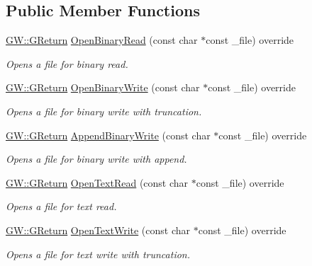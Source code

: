 \subsection*{Public Member Functions}
\begin{DoxyCompactItemize}
\item 
\hyperlink{namespaceGW_a67a839e3df7ea8a5c5686613a7a3de21}{G\+W\+::\+G\+Return} \hyperlink{classFileIO_a0adeb88dd23bb5897e8315ab0029c835}{Open\+Binary\+Read} (const char $\ast$const \+\_\+file) override
\begin{DoxyCompactList}\small\item\em Opens a file for binary read. \end{DoxyCompactList}\item 
\hyperlink{namespaceGW_a67a839e3df7ea8a5c5686613a7a3de21}{G\+W\+::\+G\+Return} \hyperlink{classFileIO_a5cd87c21a72ae2dba21a9f3e50841e6e}{Open\+Binary\+Write} (const char $\ast$const \+\_\+file) override
\begin{DoxyCompactList}\small\item\em Opens a file for binary write with truncation. \end{DoxyCompactList}\item 
\hyperlink{namespaceGW_a67a839e3df7ea8a5c5686613a7a3de21}{G\+W\+::\+G\+Return} \hyperlink{classFileIO_ab26fc846b30446edf28ac922759c9e5e}{Append\+Binary\+Write} (const char $\ast$const \+\_\+file) override
\begin{DoxyCompactList}\small\item\em Opens a file for binary write with append. \end{DoxyCompactList}\item 
\hyperlink{namespaceGW_a67a839e3df7ea8a5c5686613a7a3de21}{G\+W\+::\+G\+Return} \hyperlink{classFileIO_a3d93902abce1baec299cd63891798681}{Open\+Text\+Read} (const char $\ast$const \+\_\+file) override
\begin{DoxyCompactList}\small\item\em Opens a file for text read. \end{DoxyCompactList}\item 
\hyperlink{namespaceGW_a67a839e3df7ea8a5c5686613a7a3de21}{G\+W\+::\+G\+Return} \hyperlink{classFileIO_a4e51443206e9cf97dcac28719dbeb23e}{Open\+Text\+Write} (const char $\ast$const \+\_\+file) override
\begin{DoxyCompactList}\small\item\em Opens a file for text write with truncation. \end{DoxyCompactList}\item 

\end{DoxyCompactItemize}
